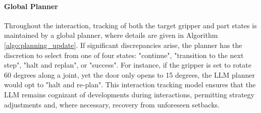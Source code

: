 \paragraph{Global Planner} 
\label{ssec:global_planner}
Throughout the interaction, tracking of both the target gripper and part states is maintained by a global planner, where details are given in Algorithm \ref{algo:planning_update}. If significant discrepancies arise, the planner has the discretion to select from one of four states: "continue", "transition to the next step", "halt and replan", or "success". For instance, if the gripper is set to rotate 60 degrees along a joint, yet the door only opens to 15 degrees, the LLM planner would opt to "halt and re-plan". This interaction tracking model ensures that the LLM remains cognizant of developments during interactions, permitting strategy adjustments and, where necessary, recovery from unforeseen setbacks.










